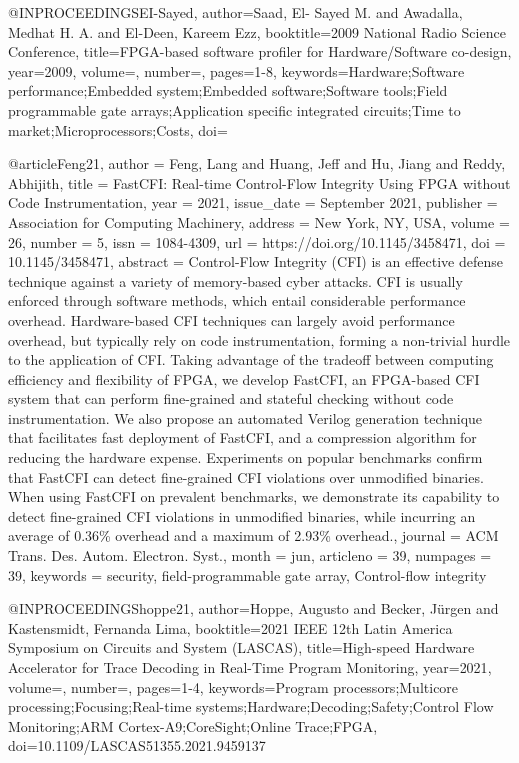 {@INPROCEEDINGS{EI-Sayed,
  author={Saad, El- Sayed M. and Awadalla, Medhat H. A. and El-Deen, Kareem Ezz},
  booktitle={2009 National Radio Science Conference}, 
  title={FPGA-based software profiler for Hardware/Software co-design}, 
  year={2009},
  volume={},
  number={},
  pages={1-8},
  keywords={Hardware;Software performance;Embedded system;Embedded software;Software tools;Field programmable gate arrays;Application specific integrated circuits;Time to market;Microprocessors;Costs},
  doi={}}%


@article{Feng21,
author = {Feng, Lang and Huang, Jeff and Hu, Jiang and Reddy, Abhijith},
title = {FastCFI: Real-time Control-Flow Integrity Using FPGA without Code Instrumentation},
year = {2021},
issue_date = {September 2021},
publisher = {Association for Computing Machinery},
address = {New York, NY, USA},
volume = {26},
number = {5},
issn = {1084-4309},
url = {https://doi.org/10.1145/3458471},
doi = {10.1145/3458471},
abstract = {Control-Flow Integrity (CFI) is an effective defense technique against a variety of memory-based cyber attacks. CFI is usually enforced through software methods, which entail considerable performance overhead. Hardware-based CFI techniques can largely avoid performance overhead, but typically rely on code instrumentation, forming a non-trivial hurdle to the application of CFI. Taking advantage of the tradeoff between computing efficiency and flexibility of FPGA, we develop FastCFI, an FPGA-based CFI system that can perform fine-grained and stateful checking without code instrumentation. We also propose an automated Verilog generation technique that facilitates fast deployment of FastCFI, and a compression algorithm for reducing the hardware expense. Experiments on popular benchmarks confirm that FastCFI can detect fine-grained CFI violations over unmodified binaries. When using FastCFI on prevalent benchmarks, we demonstrate its capability to detect fine-grained CFI violations in unmodified binaries, while incurring an average of 0.36\% overhead and a maximum of 2.93\% overhead.},
journal = {ACM Trans. Des. Autom. Electron. Syst.},
month = jun,
articleno = {39},
numpages = {39},
keywords = {security, field-programmable gate array, Control-flow integrity}
}

@INPROCEEDINGS{hoppe21,
  author={Hoppe, Augusto and Becker, Jürgen and Kastensmidt, Fernanda Lima},
  booktitle={2021 IEEE 12th Latin America Symposium on Circuits and System (LASCAS)}, 
  title={High-speed Hardware Accelerator for Trace Decoding in Real-Time Program Monitoring}, 
  year={2021},
  volume={},
  number={},
  pages={1-4},
  keywords={Program processors;Multicore processing;Focusing;Real-time systems;Hardware;Decoding;Safety;Control Flow Monitoring;ARM Cortex-A9;CoreSight;Online Trace;FPGA},
  doi={10.1109/LASCAS51355.2021.9459137}}

}
